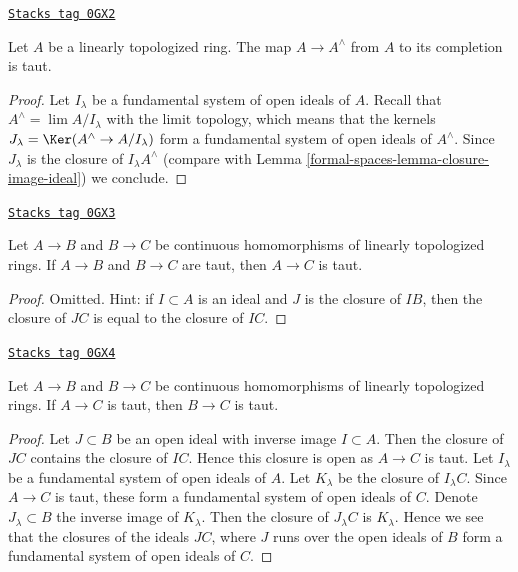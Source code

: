 \begin{lemma}
\label{formal-spaces-lemma-completion-taut}
\href{https://stacks.math.columbia.edu/tag/0GX2}{\texttt{Stacks tag 0GX2}}

Let $A$ be a linearly topologized ring. The map $A \to A^\wedge$
from $A$ to its completion is taut.
\end{lemma}

\begin{proof}
Let $I_\lambda$ be a fundamental system of open ideals of $A$.
Recall that $A^\wedge = \lim A/I_\lambda$ with the limit topology,
which means that the kernels $J_\lambda = \Ker(A^\wedge \to A/I_\lambda)$
form a fundamental system of open ideals of $A^\wedge$.
Since $J_\lambda$ is the closure of $I_\lambda A^\wedge$
(compare with Lemma \ref{formal-spaces-lemma-closure-image-ideal}) we conclude.
\end{proof}

\begin{lemma}
\label{formal-spaces-lemma-composition-taut}
\href{https://stacks.math.columbia.edu/tag/0GX3}{\texttt{Stacks tag 0GX3}}

Let $A \to B$ and $B \to C$ be continuous homomorphisms of
linearly topologized rings. If $A \to B$ and $B \to C$ are taut, then
$A \to C$ is taut.
\end{lemma}

\begin{proof}
Omitted. Hint: if $I \subset A$ is an ideal and $J$ is the closure
of $IB$, then the closure of $JC$ is equal to the closure of $IC$.
\end{proof}

\begin{lemma}
\label{formal-spaces-lemma-permanence-taut}
\href{https://stacks.math.columbia.edu/tag/0GX4}{\texttt{Stacks tag 0GX4}}

Let $A \to B$ and $B \to C$ be continuous homomorphisms of
linearly topologized rings. If $A \to C$ is taut, then
$B \to C$ is taut.
\end{lemma}

\begin{proof}
Let $J \subset B$ be an open ideal with inverse image $I \subset A$.
Then the closure of $JC$ contains the closure of $IC$. Hence this
closure is open as $A \to C$ is taut. Let $I_\lambda$ be a fundamental
system of open ideals of $A$. Let $K_\lambda$ be the closure of
$I_\lambda C$. Since $A \to C$ is taut, these form a fundamental
system of open ideals of $C$. Denote $J_\lambda \subset B$ the inverse image
of $K_\lambda$. Then the closure of $J_\lambda C$ is $K_\lambda$.
Hence we see that the closures of the ideals $JC$, where $J$ runs over
the open ideals of $B$ form a fundamental system of open ideals of $C$.
\end{proof}


